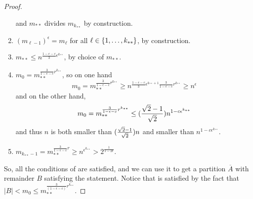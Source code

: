 \begin{theorem}[Theorem 4.16]
\begin{proof}
\begin{enumerate}
                    and $m_{**}$ divides $m_{k_{**}}$ by construction.
                \item $(m_{\ell-1})^\epsilon = m_\ell$ for all $\ell \in \{ 1, \dots, k_{**} \}$, by construction.
                \item $m_{**} \leq n^{\frac{1-\epsilon-c}{3}\epsilon^{k_{**}}}$, by choice of $m_{**}$.
                \item $m_0 = m_{**}^{\frac{3}{1-\epsilon-c}r^{k_{**}}}$, so on one hand
                    \[
                        m_0 = m_{**}^{\frac{3}{1-\epsilon-c}r^{k_{**}}} \geq n^{\frac{1-\epsilon-c}{3}\epsilon^{k_{**}+1} \frac{3}{1-\epsilon-c}r^{k_{**}}}
                            \geq n^{\epsilon}
                    \]
                    and on the other hand,
                    \[
                        m_0 = m_{**}^{\frac{3}{1-\epsilon-c}r^{k_{**}}} \leq ( \frac{\sqrt{2}-1}{\sqrt{2}} ) n^{1 - c \epsilon^{k_{**}}}
                    \]
                    and thus $n$ is both smaller than $( \frac{\sqrt{2}-1}{\sqrt{2}} ) n$ and
                    smaller than $n^{1 - c \epsilon^{k_{**}}}$.
                \item $m_{k_{**}-1} = m_{**}^{\frac{3}{1-\epsilon-c}r} \geq n^{\epsilon^{k_{**}}} > 2^{\frac{1}{1-2\epsilon}}$.
            \end{enumerate}
            So, all the conditions of  are satisfied,
            and we can use it to get a partition $\overline{A}$ with remainder $B$ satisfying the statement.
            Notice that 
            is satisfied by the fact that $|B| < m_0 \leq m_{**}^{\frac{3}{(1-\epsilon-c)}r^{k_{**}}}$.
        \end{proof}
    \end{theorem}

